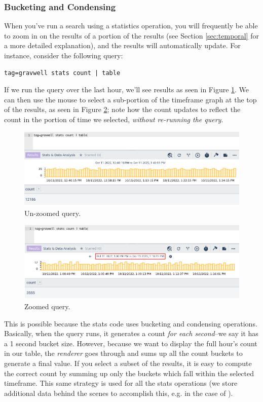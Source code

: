 \subsubsection{Bucketing and Condensing}

When you've run a search using a statistics operation, you will frequently be able to zoom in on the results of a portion of the results (see Section \ref{sec:temporal} for a more detailed explanation), and the results will automatically update. For instance, consider the following query:

\begin{verbatim}
tag=gravwell stats count | table
\end{verbatim}

If we run the query over the last hour, we'll see results as seen in Figure \ref{fig:bucket1}. We can then use the mouse to select a sub-portion of the timeframe graph at the top of the results, as seen in Figure \ref{fig:bucket2}; note how the count updates to reflect the count in the portion of time we selected, \emph{without re-running the query}.

\begin{figure}
	\includegraphics[width=0.8\linewidth]{images/bucket1.png}
	\caption{Un-zoomed query.}
	\label{fig:bucket1}
\end{figure}

\begin{figure}
	\includegraphics[width=0.8\linewidth]{images/bucket2.png}
	\caption{Zoomed query.}
	\label{fig:bucket2}
\end{figure}

This is possible because the stats code uses bucketing and condensing operations. Basically, when the query runs, it generates a count \emph{for each second}--we say it has a 1 second bucket size. However, because we want to display the full hour's count in our table, the \emph{renderer} goes through and sums up all the count buckets to generate a final value. If you select a subset of the results, it is easy to compute the correct count by summing up only the buckets which fall within the selected timeframe. This same strategy is used for all the stats operations (we store additional data behind the scenes to accomplish this, e.g. in the case of ).

